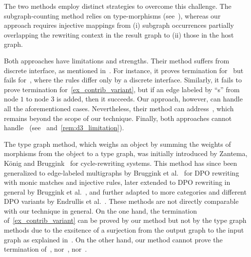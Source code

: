 The two methods employ distinct strategies to overcome this challenge. The subgraph-counting method relies on type-morphisms (see~\cite[page 9, remark 4.11, Lemma 4.23]{overbeek2024termination_lmcs}), whereas our approach requires injective mappings from (i) subgraph occurrences partially overlapping the rewriting context in the result graph to (ii) those in the host graph.

  
Both approaches have limitations and strengths. Their method suffers from discrete interface, as mentioned in~\cite[Example 5.5]{overbeek2024termination_lmcs}. For instance, it proves termination for~\cite[Example 5.5]{overbeek2024termination_lmcs} but fails for~\cite[Example 6.3]{endrullis2024generalized_arxiv_v2}, where the rules differ only by a discrete interface. 
Similarly, it fails to prove termination for~\autoref{ex_contrib_variant}, but if an edge labeled by ``s'' from node $1$ to node $3$ is added, then it succeeds. Our approach, however, can handle all the aforementioned cases. Nevertheless, their method can address~\cite[Example 4.1]{plump1995ontermination}, which remains beyond the scope of our technique. Finally, both approaches cannot handle~\cite[Example D.3]{endrullis2024generalized_arxiv_v2} (see~\cite[Remark 6.2]{overbeek2024termination_lmcs} and~\autoref{rem:d3_limitation}).

The type graph method, which weighs an object by summing the weights of morphisms from the object to a type graph, was initially introduced by Zantema, K{\"o}nig and Bruggink~\cite{zantema2014termination} for cycle-rewriting systems. 
This method has since been generalized to edge-labeled multigraphs by Bruggink et al.~\cite{bruggink2014termination} for DPO rewriting with monic matches and injective rules, later extended to DPO rewriting in general by Bruggink et al.~\cite{bruggink2015proving}, and further adapted to more categories and different DPO variants by Endrullis et al.~\cite{endrullis2024generalized_arxiv_v2}. 
These methods are not directly comparable with our technique in general.
On the one hand, the termination of~\autoref{ex_contrib_variant} can be proved by our method but not by the type graph methods due to the exsitence of a surjection from the output graph to the input graph as explained in~\cite[Example D.4]{endrullis2024generalized_arxiv_v2}. On the other hand, our method cannot prove the termination of~\cite[Example 1, 5 and Ad-hoc Routing Protocol]{bruggink2014termination}, nor~\cite[Example 5, 6]{bruggink2015proving}, nor~\cite[Examples D2 and D3]{endrullis2024generalized_arxiv_v2}.

